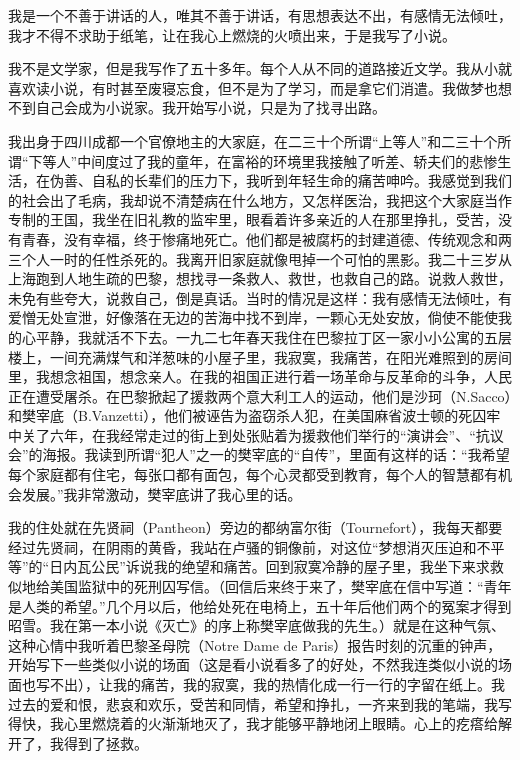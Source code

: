 \par 我是一个不善于讲话的人，唯其不善于讲话，有思想表达不出，有感情无法倾吐，我才不得不求助于纸笔，让在我心上燃烧的火喷出来，于是我写了小说。
\par 我不是文学家，但是我写作了五十多年。每个人从不同的道路接近文学。我从小就喜欢读小说，有时甚至废寝忘食，但不是为了学习，而是拿它们消遣。我做梦也想不到自己会成为小说家。我开始写小说，只是为了找寻出路。
\par 我出身于四川成都一个官僚地主的大家庭，在二三十个所谓“上等人”和二三十个所谓“下等人”中间度过了我的童年，在富裕的环境里我接触了听差、轿夫们的悲惨生活，在伪善、自私的长辈们的压力下，我听到年轻生命的痛苦呻吟。我感觉到我们的社会出了毛病，我却说不清楚病在什么地方，又怎样医治，我把这个大家庭当作专制的王国，我坐在旧礼教的监牢里，眼看着许多亲近的人在那里挣扎，受苦，没有青春，没有幸福，终于惨痛地死亡。他们都是被腐朽的封建道德、传统观念和两三个人一时的任性杀死的。我离开旧家庭就像甩掉一个可怕的黑影。我二十三岁从上海跑到人地生疏的巴黎，想找寻一条救人、救世，也救自己的路。说救人救世，未免有些夸大，说救自己，倒是真话。当时的情况是这样：我有感情无法倾吐，有爱憎无处宣泄，好像落在无边的苦海中找不到岸，一颗心无处安放，倘使不能使我的心平静，我就活不下去。一九二七年春天我住在巴黎拉丁区一家小小公寓的五层楼上，一间充满煤气和洋葱味的小屋子里，我寂寞，我痛苦，在阳光难照到的房间里，我想念祖国，想念亲人。在我的祖国正进行着一场革命与反革命的斗争，人民正在遭受屠杀。在巴黎掀起了援救两个意大利工人的运动，他们是沙珂（N.Sacco）和樊宰底（B.Vanzetti），他们被诬告为盗窃杀人犯，在美国麻省波士顿的死囚牢中关了六年，在我经常走过的街上到处张贴着为援救他们举行的“演讲会”、“抗议会”的海报。我读到所谓“犯人”之一的樊宰底的“自传”，里面有这样的话：“我希望每个家庭都有住宅，每张口都有面包，每个心灵都受到教育，每个人的智慧都有机会发展。”我非常激动，樊宰底讲了我心里的话。
\par 我的住处就在先贤祠（Pantheon）旁边的都纳富尔街（Tournefort），我每天都要经过先贤祠，在阴雨的黄昏，我站在卢骚的铜像前，对这位“梦想消灭压迫和不平等”的“日内瓦公民”诉说我的绝望和痛苦。回到寂寞冷静的屋子里，我坐下来求救似地给美国监狱中的死刑囚写信。（回信后来终于来了，樊宰底在信中写道：“青年是人类的希望。”几个月以后，他给处死在电椅上，五十年后他们两个的冤案才得到昭雪。我在第一本小说《灭亡》的序上称樊宰底做我的先生。）就是在这种气氛、这种心情中我听着巴黎圣母院（Notre Dame de Paris）报告时刻的沉重的钟声，开始写下一些类似小说的场面（这是看小说看多了的好处，不然我连类似小说的场面也写不出），让我的痛苦，我的寂寞，我的热情化成一行一行的字留在纸上。我过去的爱和恨，悲哀和欢乐，受苦和同情，希望和挣扎，一齐来到我的笔端，我写得快，我心里燃烧着的火渐渐地灭了，我才能够平静地闭上眼睛。心上的疙瘩给解开了，我得到了拯救。
